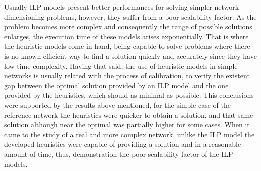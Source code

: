 Usually ILP models present better performances for solving simpler network dimensioning problems, however, they suffer from a poor scalability factor. As the problem becomes more complex and consequently the range of possible solutions enlarges, the execution time of these models arises exponentially. That is where the heuristic models come in hand, being capable to solve problems where there is no known efficient way to find a solution quickly and accurately since they have low time complexity. Having that said, the use of heuristic models in simple networks is usually related with the process of calibration, to verify the existent gap between the optimal solution provided by an ILP model and the one provided by the heuristics, which should as minimal as possible. This conclusions were supported by the results above mentioned, for the simple case of the reference network the heuristics were quicker to obtain a solution, and that same solution although near the optimal was partially higher for some cases. When it came to the study of a real and more complex network, unlike the ILP model the developed heuristics were capable of providing a solution and in a reasonable amount of time, thus, demonstration the poor scalability factor of the ILP models. 

\cleardoublepage